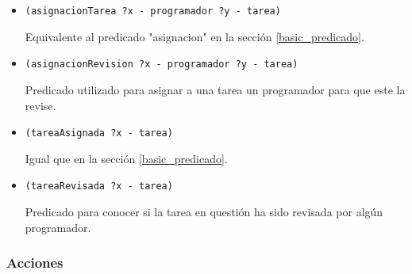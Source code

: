 \documentclass[11pt]{article}
\begin{document}
\begin{itemize}
  \item \verb|(asignacionTarea ?x - programador ?y - tarea)|
  
  Equivalente al predicado "asignacion" en la sección \ref{basic_predicado}.
  
  
  \item \verb|(asignacionRevision ?x - programador ?y - tarea)|
  
  Predicado utilizado para asignar a una tarea un programador para que este la revise. 
  
  
  \item \verb|(tareaAsignada ?x - tarea)|
  
  Igual que en la sección \ref{basic_predicado}.
  
  
  \item \verb|(tareaRevisada ?x - tarea)|
  
  Predicado para conocer si la tarea en questión ha sido revisada por algún programador.
  
\end{itemize}

\subsubsection{Acciones}
\end{document}
